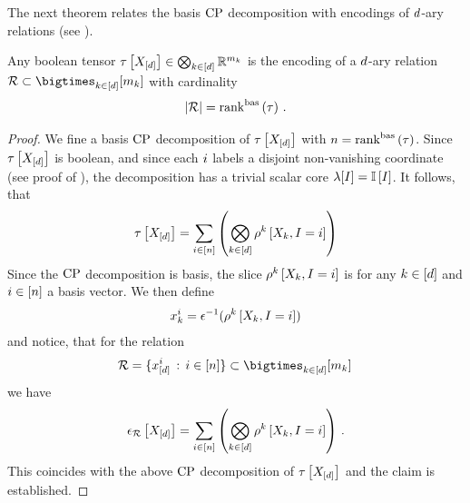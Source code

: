 %
The next theorem relates the basis $\mathrm{CP}$ decomposition with encodings of $d$-ary relations (see ).

\begin{theorem}
    Any boolean tensor $ \tau\left[X_{[d]}\right]\in\bigotimes_{k\in[d]} \mathbb{R}^{m_{k}}$ is the encoding of a $d$-ary relation $\exrelation\subset\facstates$ with cardinality
    \begin{align*}
        \left|\mathcal{R}\right| = \mathrm{rank}^{\mathrm{bas}}\left(\tau\right) \, .
    \end{align*}
\end{theorem}
\begin{proof}
    We fine a basis $\mathrm{CP}$ decomposition of $\tau\left[X_{[d]}\right]$ with $n=\mathrm{rank}^{\mathrm{bas}}\left(\tau\right)$.
    Since $\tau\left[X_{[d]}\right]$ is boolean, and since each $i$ labels a disjoint non-vanishing coordinate (see proof of ), the decomposition has a trivial scalar core $\lambda[I]=\mathbb{I}\left[I\right]$.
    It follows, that
    \begin{align*}
        \tau\left[X_{[d]}\right] = \sum_{i\in[n]} \left(\bigotimes_{k\in[d]}\rho^{k}\left[X_{k},I=i\right]\right)
    \end{align*}
    Since the $\mathrm{CP}$ decomposition is basis, the slice $\rho^{k}\left[X_{k},I=i\right]$ is for any $k\in[d]$ and $i\in[n]$ a basis vector.
    We then define
    \begin{align*}
        x_{k}^{i} = \epsilon^{-1}(\rho^{k}\left[X_{k},I=i\right])
    \end{align*}
    and notice, that for the relation
    \begin{align*}
        \exrelation = \{ \shortcatindices^{\decindex}  \wcols \decindexin\} \subset \facstates \,
    \end{align*}
    we have
    \begin{align*}
        \epsilon_{\mathcal{R}}\left[X_{[d]}\right] = \sum_{i\in[n]} \left(\bigotimes_{k\in[d]}\rho^{k}\left[X_{k},I=i\right]\right) \, .
    \end{align*}
    This coincides with the above $\mathrm{CP}$ decomposition of $\tau\left[X_{[d]}\right]$ and the claim is established.
\end{proof}



